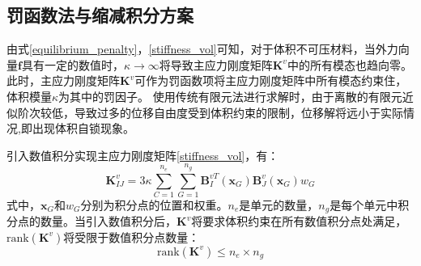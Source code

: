 \subsection{罚函数法与缩减积分方案}

由式\eqref{equilibrium_penalty}，\eqref{stiffness_vol}可知，对于体积不可压材料，当外力向量$\boldsymbol f$具有一定的数值时，$\kappa \rightarrow \infty$将导致主应力刚度矩阵$\boldsymbol K^v$中的所有模态也趋向零。
此时，主应力刚度矩阵$\boldsymbol K^v$可作为罚函数项将主应力刚度矩阵中所有模态约束住，体积模量$\kappa$为其中的罚因子。
使用传统有限元法进行求解时，由于离散的有限元近似阶次较低，导致过多的位移自由度受到体积约束的限制，位移解将远小于实际情况,即出现体积自锁现象。

引入数值积分实现主应力刚度矩阵\eqref{stiffness_vol}，有：
\begin{equation}\label{integration}
    \boldsymbol K^v_{IJ} =  3\kappa \sum_{C=1}^{n_e}\sum_{G=1}^{n_g} \boldsymbol B^{vT}_I(\boldsymbol x_G) \boldsymbol B^v_J(\boldsymbol x_G) w_G
\end{equation}
式中，$\boldsymbol x_G$和$w_G$分别为积分点的位置和权重。$n_e$是单元的数量，$n_g$是每个单元中积分点的数量。当引入数值积分后，$\boldsymbol K^v$将要求体积约束在所有数值积分点处满足，$\mathrm{rank}(\boldsymbol K^v)$将受限于数值积分点数量：
\begin{equation}\label{rank}
    \mathrm{rank}(\boldsymbol K^v)\le n_e \times n_g
\end{equation}

